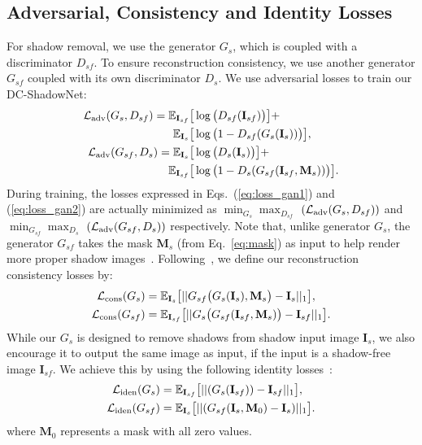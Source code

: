 \documentclass[10pt,twocolumn,letterpaper]{article}
\begin{document}
\subsection{Adversarial, Consistency and Identity Losses}
For shadow removal, we use the generator $G_s$, which is coupled with a discriminator $D_{sf}$. To ensure reconstruction consistency, we use another generator $G_{sf}$ coupled with its own discriminator $D_{s}$. We use adversarial losses to train our DC-ShadowNet:
\begin{align}
	\mathcal{L}_{\rm adv}(G_s, D_{sf})=  
	\mathbb{E}_{\mathbf{I}_{sf}} \big[&\log \big(D_{sf}(\mathbf{I}_{sf})\big)\big]\label{eq:loss_gan1}
	+\\\mathbb{E}_{\mathbf{I}_s} \big[&\log \big(1-D_{sf}(G_s(\mathbf{I}_s))\big)\big],\nonumber
	\\
	\mathcal{L}_{\rm adv}(G_{sf}, D_s)=  
	\mathbb{E}_{\mathbf{I}_{s}} \big[&\log \big(D_s(\mathbf{I}_{s})\big)\big]\label{eq:loss_gan2}
	+ \\ \mathbb{E}_{\mathbf{I}_{sf}}\big[&\log \big(1-D_s(G_{sf}(\mathbf{I}_{sf}, \mathbf{M}_s))\big)\big].\nonumber
\end{align}
During training, the losses expressed in Eqs.~(\ref{eq:loss_gan1}) and (\ref{eq:loss_gan2}) are actually minimized as $\min_{G_s}\max_{D_{sf}}$ $(\mathcal{L}_{\rm adv}(G_s, D_{sf}))$ and $\min_{G_{sf}}\max_{D_s}$ $(\mathcal{L}_{\rm adv}(G_{sf}, D_s))$ respectively. 
Note that, unlike generator $G_s$, the generator $G_{sf}$  takes the mask $\mathbf{M}_s$ (from Eq.~\ref{eq:mask}) as input to help render  more proper shadow images~\cite{Hu19}. Following~\cite{Zhu17,yan2020optical}, we define our reconstruction consistency losses by:
\begin{align}
	\mathcal{L}_{\rm cons}(G_s)&=  \mathbb{E}_{\mathbf{I}_s}\big[||G_{sf}\big(G_s(\mathbf{I}_s), \mathbf{M}_s\big)-\mathbf{I}_{s}||_{1}\big],  
	\label{eq:loss_cycle1}
	\\
	\mathcal{L}_{\rm cons}(G_{sf})& =  \mathbb{E}_{\mathbf{I}_{sf}}\big[||G_s\big(G_{sf}(\mathbf{I}_{sf}, \mathbf{M}_s)\big)-\mathbf{I}_{sf}||_{1}\big].
	\label{eq:loss_cycle2}
\end{align}
While our $G_s$ is designed to remove shadows from shadow input image $\mathbf{I}_s$, we also encourage it to output the same image as input, if the input is a shadow-free image $\mathbf{I}_{sf}$. We achieve this by using the following identity losses~\cite{Zhu17}:
\begin{align}
	\mathcal{L}_{\rm iden}(G_s) &=  
	\mathbb{E}_{\mathbf{I}_{sf}} \big[||(G_s(\mathbf{I}_{sf}))-\mathbf{I}_{sf}||_{1}\big],
	\label{eq:loss_identity1}
	\\
	\mathcal{L}_{\rm iden}(G_{sf}) &= 
	\mathbb{E}_{\mathbf{I}_{s}} \big[||(G_{sf}(\mathbf{I}_s,\mathbf{M}_0)-\mathbf{I}_s)||_{1}\big].
	\label{eq:loss_identity2}
\end{align}
where $\mathbf{M}_0$ represents a mask with all zero values. 
\end{document}
